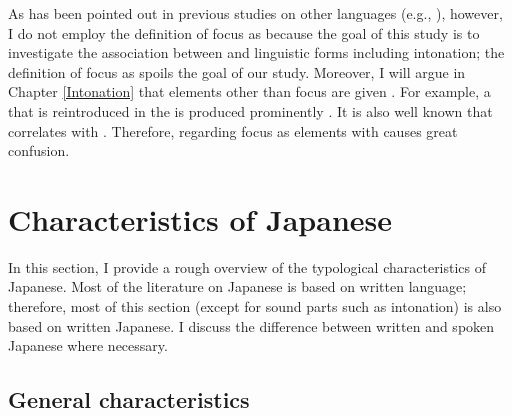 As has been pointed out in previous studies on other languages (e.g., ),
however,
I do not employ the definition of focus as 
because the goal of this study is to investigate the association between  and linguistic forms including intonation;
the definition of focus as  spoils the goal of our study.
Moreover,
I will argue in Chapter \ref{Intonation} that 
elements other than focus are given .
For example, a  that is reintroduced in the  is produced prominently \cite[see also][]{gundel99}.
It is also well known that
 correlates with .
Therefore, regarding focus as elements with  causes great confusion.






\section{Characteristics of Japanese}\label{BackSecCharJap}

In this section, I provide a rough overview of the typological characteristics of Japanese.
Most of the literature on Japanese is based on written language;
therefore, most of this section (except for sound parts such as intonation) is also based on written Japanese.
I discuss the difference between written and spoken Japanese
where necessary.


\subsection{General characteristics}\label{BackSubSecGeneralChar}

